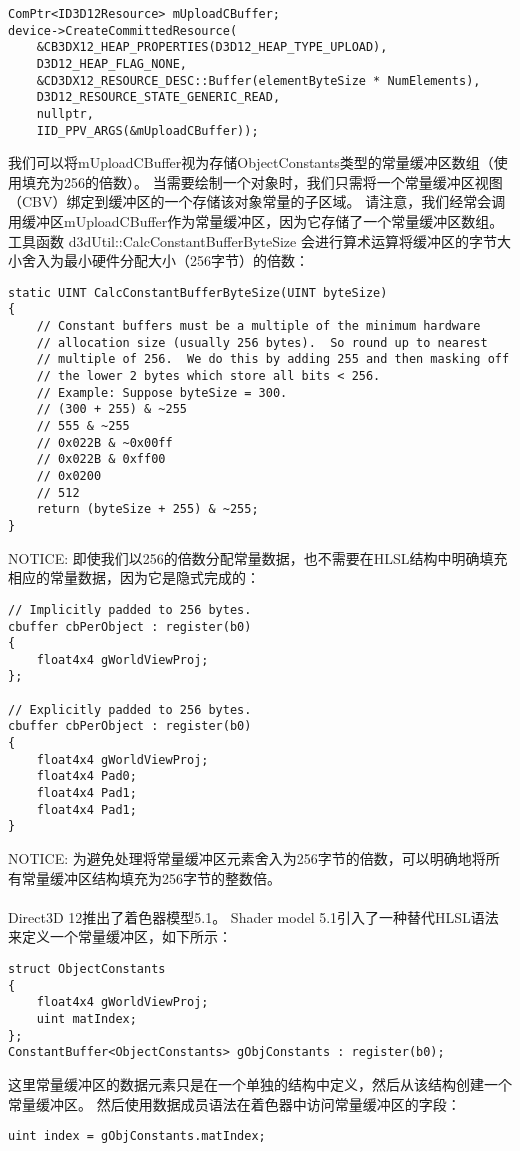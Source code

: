 \begin{flushleft}
\begin{lstlisting}
ComPtr<ID3D12Resource> mUploadCBuffer;
device->CreateCommittedResource(
    &CB3DX12_HEAP_PROPERTIES(D3D12_HEAP_TYPE_UPLOAD), 
    D3D12_HEAP_FLAG_NONE, 
    &CD3DX12_RESOURCE_DESC::Buffer(elementByteSize * NumElements),
    D3D12_RESOURCE_STATE_GENERIC_READ,
    nullptr, 
    IID_PPV_ARGS(&mUploadCBuffer));
\end{lstlisting}
我们可以将mUploadCBuffer视为存储ObjectConstants类型的常量缓冲区数组（使用填充为256的倍数）。 当需要绘制一个对象时，我们只需将一个常量缓冲区视图（CBV）绑定到缓冲区的一个存储该对象常量的子区域。 请注意，我们经常会调用缓冲区mUploadCBuffer作为常量缓冲区，因为它存储了一个常量缓冲区数组。\\
工具函数 d3dUtil::CalcConstantBufferByteSize 会进行算术运算将缓冲区的字节大小舍入为最小硬件分配大小（256字节）的倍数：\\
\begin{lstlisting}
static UINT CalcConstantBufferByteSize(UINT byteSize)
{
    // Constant buffers must be a multiple of the minimum hardware
    // allocation size (usually 256 bytes).  So round up to nearest
    // multiple of 256.  We do this by adding 255 and then masking off
    // the lower 2 bytes which store all bits < 256.
    // Example: Suppose byteSize = 300.
    // (300 + 255) & ~255
    // 555 & ~255
    // 0x022B & ~0x00ff
    // 0x022B & 0xff00
    // 0x0200
    // 512
    return (byteSize + 255) & ~255;
}
\end{lstlisting}
NOTICE: 即使我们以256的倍数分配常量数据，也不需要在HLSL结构中明确填充相应的常量数据，因为它是隐式完成的：\\
\begin{lstlisting}
// Implicitly padded to 256 bytes.
cbuffer cbPerObject : register(b0)
{
    float4x4 gWorldViewProj;
};

// Explicitly padded to 256 bytes.
cbuffer cbPerObject : register(b0)
{
    float4x4 gWorldViewProj;
    float4x4 Pad0;
    float4x4 Pad1;
    float4x4 Pad1;
}
\end{lstlisting}
NOTICE: 为避免处理将常量缓冲区元素舍入为256字节的倍数，可以明确地将所有常量缓冲区结构填充为256字节的整数倍。\\
~\\
Direct3D 12推出了着色器模型5.1。 Shader model 5.1引入了一种替代HLSL语法来定义一个常量缓冲区，如下所示：\\
\begin{lstlisting}
struct ObjectConstants
{
    float4x4 gWorldViewProj;
    uint matIndex;
};
ConstantBuffer<ObjectConstants> gObjConstants : register(b0);
\end{lstlisting}
这里常量缓冲区的数据元素只是在一个单独的结构中定义，然后从该结构创建一个常量缓冲区。 然后使用数据成员语法在着色器中访问常量缓冲区的字段：\\
\begin{lstlisting}
uint index = gObjConstants.matIndex;
\end{lstlisting}
\end{flushleft}

